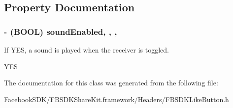 \subsection{Property Documentation}
\hypertarget{interface_f_b_s_d_k_like_button_ab7c25ce02e165da8ebd690c2348594ee}{
\subsubsection[{sound\-Enabled}]{\setlength{\rightskip}{0pt plus 5cm}-\/ (B\-O\-O\-L) sound\-Enabled\hspace{0.3cm}{\ttfamily [read]}, {\ttfamily [write]}, {\ttfamily [nonatomic]}, {\ttfamily [assign]}}}\label{interface_f_b_s_d_k_like_button_ab7c25ce02e165da8ebd690c2348594ee}
If Y\-E\-S, a sound is played when the receiver is toggled.

Y\-E\-S 

The documentation for this class was generated from the following file\-:\begin{DoxyCompactItemize}
\item 
Facebook\-S\-D\-K/\-F\-B\-S\-D\-K\-Share\-Kit.\-framework/\-Headers/F\-B\-S\-D\-K\-Like\-Button.\-h\end{DoxyCompactItemize}
